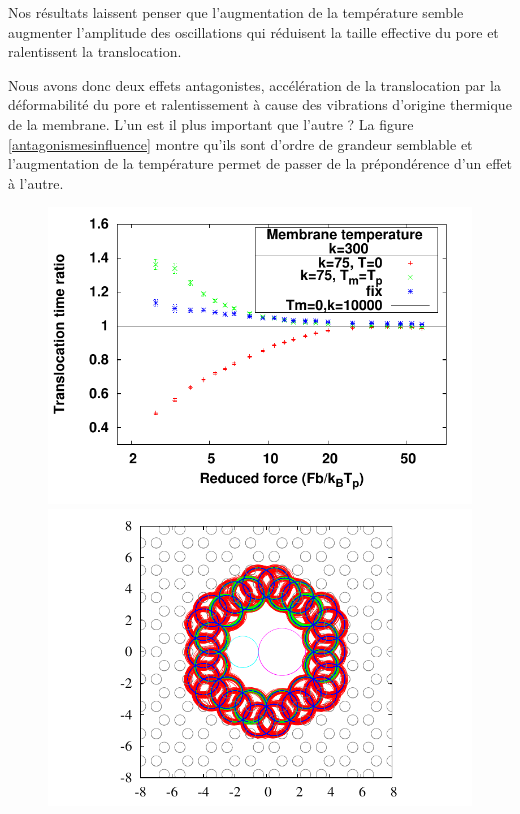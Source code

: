  Nos résultats laissent penser que l'augmentation de la température semble augmenter l'amplitude des oscillations qui réduisent la taille effective du pore et ralentissent la translocation.
 \newpage
 
 Nous avons donc deux effets antagonistes, accélération de la translocation par la déformabilité du pore et ralentissement à cause des vibrations d'origine thermique de la membrane. L'un est il plus important que l'autre ? La figure \ref{antagonismesinfluence} montre qu'ils sont d'ordre de grandeur semblable et l'augmentation de la température permet de passer de la prépondérence d'un effet à l'autre.

\begin{figure}[H]
\includegraphics[width=\textwidth]{compbothbehaviour.pdf} 
\begin{minipage}{0.63\linewidth}
\includegraphics[width=\textwidth]{poreareaall.pdf}

\end{minipage}
\end{figure}
